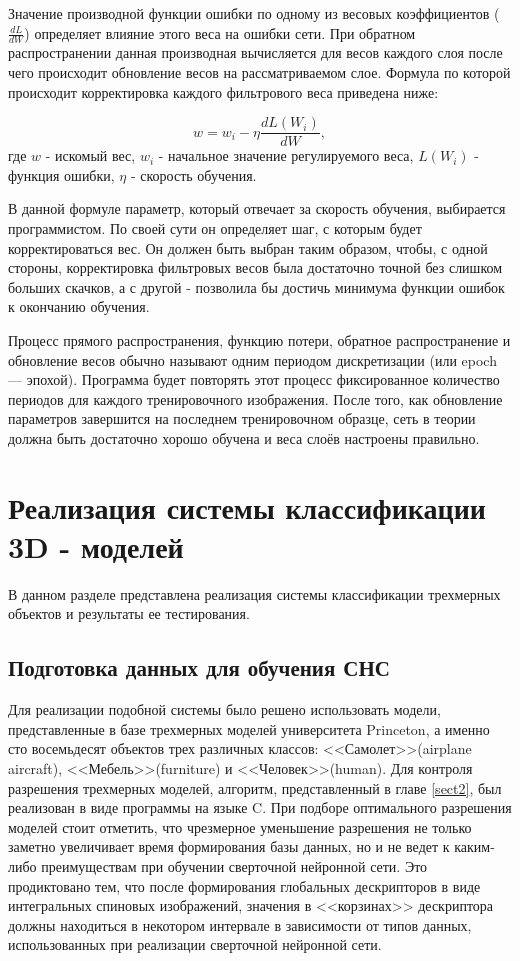 \documentclass[14pt]{article}
\numberwithin{figure}{section}
\numberwithin{equation}{section}
\begin{document}
Значение производной функции ошибки по одному из весовых коэффициентов ($\frac{dL}{dW}$) определяет влияние этого веса на ошибки сети. При обратном распространении данная производная вычисляется для весов каждого слоя после чего происходит обновление весов на рассматриваемом слое. Формула по которой происходит корректировка каждого фильтрового веса приведена ниже:

\begin{equation}
    w = w_i - \eta\frac{dL(W_i)}{dW},
\end{equation}
где $w$ - искомый вес, $w_i$ - начальное значение регулируемого веса, $L(W_i)$ - функция ошибки, $\eta$ - скорость обучения.

В данной формуле параметр, который отвечает за скорость обучения, выбирается программистом. По своей сути он определяет шаг, с которым будет корректироваться вес. Он должен быть выбран таким образом, чтобы, с одной стороны, корректировка фильтровых весов была достаточно точной без слишком больших скачков, а с другой - позволила бы достичь минимума функции ошибок к окончанию обучения.

Процесс прямого распространения, функцию потери, обратное распространение и обновление весов обычно называют одним периодом дискретизации (или epoch — эпохой). Программа будет повторять этот процесс фиксированное количество периодов для каждого тренировочного изображения. После того, как обновление параметров завершится на последнем тренировочном образце, сеть в теории должна быть достаточно хорошо обучена и веса слоёв настроены правильно.

\newpage

\section{Реализация системы классификации 3D - моделей}

В данном разделе представлена реализация системы классификации трехмерных объектов и результаты ее тестирования.

\subsection{Подготовка данных для обучения СНС}

Для реализации подобной системы было решено использовать модели, представленные в базе трехмерных моделей университета Princeton, а именно сто восемьдесят объектов трех различных классов: <<Самолет>>(airplane aircraft), <<Мебель>>(furniture) и <<Человек>>(human). Для контроля разрешения трехмерных моделей, алгоритм, представленный в главе \ref{sect2}, был реализован в виде программы на языке C. При подборе оптимального разрешения моделей стоит отметить, что чрезмерное уменьшение разрешения не только заметно увеличивает время формирования базы данных, но и не ведет к каким-либо преимуществам при обучении сверточной нейронной сети. Это продиктовано тем, что после формирования глобальных дескрипторов в виде интегральных спиновых изображений, значения в <<корзинах>> дескриптора должны находиться в некотором интервале в зависимости от типов данных, использованных при реализации сверточной нейронной сети.
\end{document}
